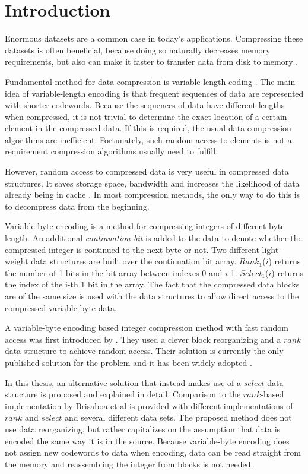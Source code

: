 \chapter{Introduction}
Enormous datasets are a common case in today's applications. Compressing these datasets is often beneficial, because doing so 
naturally decreases memory requirements, but also can make it faster to transfer data from disk to memory \citep{Zob95}. 

Fundamental method for data compression is variable-length coding \citep{Sal99}. The main idea of variable-length encoding is that 
frequent sequences of data are represented with shorter codewords. Because the sequences of data have different lengths when compressed, it is 
not trivial to determine the exact location of a certain element in the compressed data. If this is required, the usual 
data compression algorithms are inefficient. Fortunately, such random access to elements is not a requirement compression algorithms usually 
need to fulfill. 

However, random access to compressed data is very useful in compressed data structures. It saves storage space, bandwidth and 
increases the likelihood of data already being in cache \citep{Sch02}. In most compression methods, the only way to do this is to decompress data 
from the beginning. 

Variable-byte encoding is a method for compressing integers of different byte length. An additional \textit{continuation bit} is added to the data to denote whether the compressed integer
is continued to the next byte or not. Two different light-weight data structures are built over the continuation bit array. $Rank_1$($i$) returns the number of 1 bits in the bit array between 
indexes 0 and $i$-1. $Select_1$($i$) returns the index of the i-th 1 bit in the array. The fact that the compressed data blocks are of the same size is used
with the data structures to allow direct access to the compressed variable-byte data.

A variable-byte encoding based integer compression method with fast random access was first introduced by \citep{Bri09}. They used a clever block 
reorganizing and a $rank$ data structure to achieve random access. Their solution is currently the only published solution for the problem and it 
has been widely adopted \citep[e.g.][]{Kon17, Sha16}. 

In this thesis, an alternative solution that instead makes use of a $select$ data structure is proposed and explained in detail. Comparison to the $rank$-based 
implementation by Brisaboa et al is provided with different implementations of $rank$ and $select$ and several different data sets. The proposed method does not use data 
reorganizing, but rather capitalizes on the assumption that data is encoded the same way it is in the source. Because variable-byte encoding does not assign 
new codewords to data when encoding, data can be read straight from the memory and reassembling the integer from blocks is not needed.

